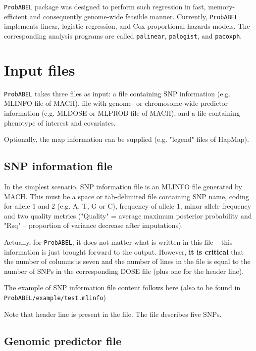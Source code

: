 \documentclass[12pt]{article}
\begin{document}
\texttt{ProbABEL} package was designed to perform such regression in fast, 
memory-efficient and consequently genome-wide feasible manner. 
Currently, \texttt{ProbABEL} implements linear, logistic regression, 
and Cox proportional hazards models. The corresponding analysis 
programs are called \texttt{palinear},  \texttt{palogist},  
and \texttt{pacoxph}.


\section{Input files}
\texttt{ProbABEL} takes three files as input: a file containing SNP 
information (e.g. MLINFO file of MACH), file with genome- or 
chromosome-wide predictor information (e.g. MLDOSE or MLPROB file of MACH), 
and a file containing phenotype of interest and covariates. 

Optionally, the map information can be supplied (e.g. "legend" 
files of HapMap). 

\subsection{SNP information file}
\label{ssec:infoin}
In the simplest scenario, SNP information file is an MLINFO 
file generated by MACH. This must be a space or tab-delimited file 
containing SNP name, coding for allele 1 and 2 (e.g. A, T, G or C), 
frequency of allele 1, minor allele frequency and two quality 
metrics ("Quality" = average maximum posterior probability and 
"Rsq" -- proportion of variance decrease after imputations). 

Actually, 
for \texttt{ProbABEL}, it does not matter what is written in this file -- 
this information is just brought forward to the output. However, 
\textbf{it is critical} that the number of columns is seven and the number 
of lines in the file is equal to the number of SNPs in the 
corresponding DOSE file (plus one for the header line). 

The example of SNP information file content follows here (also 
to be found in \texttt{ProbABEL/example/test.mlinfo})



Note that header line is present in the file. The file describes 
five SNPs. 

\subsection{Genomic predictor file}
\label{ssec:dosein}
\end{document}
